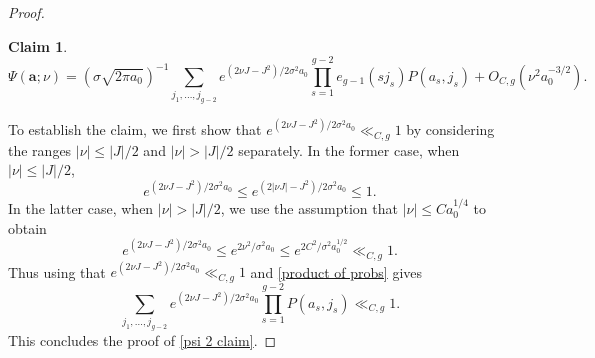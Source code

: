 \documentclass[hidelinks,11pt,reqno]{amsart}
\renewcommand{\leq}{\leqslant}
\newcommand{\ru}[1]{e_{g-1}(#1)}
\newtheorem{claim}[prop]{Claim}
\theoremstyle{remark}
\begin{document}
\begin{proof}
\begin{claim}
\begin{equation}
            \Psi(\mathbf{a};\nu)=(\sigma\sqrt{2\pi a_{0}})^{-1}\sum_{j_{1},\ldots, j_{g-2}}e^{(2\nu J-J^{2})/2\sigma^{2}a_{0}}\prod_{s=1}^{g-2}\ru{sj_{s}}P(a_{s},j_{s})+O_{C,g}(\nu^{2}a_{0}^{-3/2}).
        \end{equation}
    \end{claim} To establish the claim, we first show that $e^{(2\nu J-J^{2})/2\sigma^{2}a_{0}}\ll_{C,g}1$ by considering the ranges $|\nu|\leq |J|/2$ and $|\nu|>|J|/2$ separately. In the former case, when $|\nu|\leq |J|/2$,
    \[e^{(2\nu J-J^{2})/2\sigma^{2}a_{0}}\leq e^{(2|\nu J|-J^{2})/2\sigma^{2}a_{0}}\leq 1.\]
    In the latter case, when $|\nu|>|J|/2$, we use the assumption that $|\nu|\leq Ca_{0}^{1/4}$ to obtain
    \[e^{(2\nu J-J^{2})/2\sigma^{2}a_{0}}\leq e^{2\nu^{2}/\sigma^{2}a_{0}}\leq e^{2C^{2}/\sigma^{2}a_{0}^{1/2}}\ll_{C,g} 1.\]
    Thus using that $e^{(2\nu J-J^{2})/2\sigma^{2}a_{0}}\ll_{C,g}1$ and \cref{product of probs} gives
    \[\sum_{j_{1},\ldots, j_{g-2}}e^{(2\nu J-J^{2})/2\sigma^{2}a_{0}}\prod_{s=1}^{g-2}P(a_{s},j_{s})\ll_{C,g}1.\]
    This concludes the proof of \cref{psi 2 claim}.


\end{proof}
\end{document}
